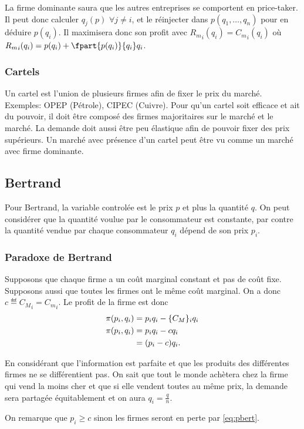 La firme dominante saura que les autres entreprises
se comportent en price-taker.
Il peut donc calculer $q_j(p)$ $\forall j \neq i$,
et le réinjecter dans $p(q_1,\ldots,q_n)$ pour en déduire $p(q_i)$.
Il maximisera donc son profit avec ${R_m}_i(q_i) = {C_m}_i(q_i)$
où ${R_m}_i(q_i) = p(q_i) + \fpart{p(q_i)}{q_i}q_i$.

\subsubsection{Cartels}
Un cartel est l'union de plusieurs firmes afin de fixer le prix du marché.
Exemples: OPEP (Pétrole), CIPEC (Cuivre).
Pour qu'un cartel soit efficace et ait du pouvoir, il doit être composé
des firmes majoritaires sur le marché et le marché. La demande doit aussi
être peu élastique afin de pouvoir fixer des prix supérieurs.
Un marché avec présence d'un cartel peut être vu comme un marché avec firme dominante.


\subsection{Bertrand}
Pour Bertrand, la variable controlée est le prix $p$ et plus la quantité $q$.
On peut considérer que la quantité voulue par le consommateur est constante,
par contre la quantité vendue par chaque consommateur $q_i$ dépend
de son prix $p_i$.

\subsubsection{Paradoxe de Bertrand}
Supposons que chaque firme a un coût marginal constant et pas de coût fixe.
Supposons aussi que toutes les firmes ont le même coût marginal.
On a donc $c \eqdef {C_M}_i = {C_m}_i$.
Le profit de la firme est donc
\begin{align}
  \nonumber
  \pi(p_i,q_i) & = p_iq_i - \{C_M\}_iq_i\\
  \nonumber
  \pi(p_i,q_i) & = p_iq_i - cq_i\\
  \label{eq:pbert}
  & = (p_i-c)q_i.
\end{align}

En considérant que l'information est parfaite et que les produits
des différentes firmes ne se différentient pas.
On sait que tout le monde achètera chez la firme qui vend la moins cher
et que si elle vendent toutes au même prix,
la demande sera partagée équitablement et on aura $q_i = \frac{q}{n}$.

On remarque que $p_i \geq c$ sinon les firmes seront en perte
par \eqref{eq:pbert}.

